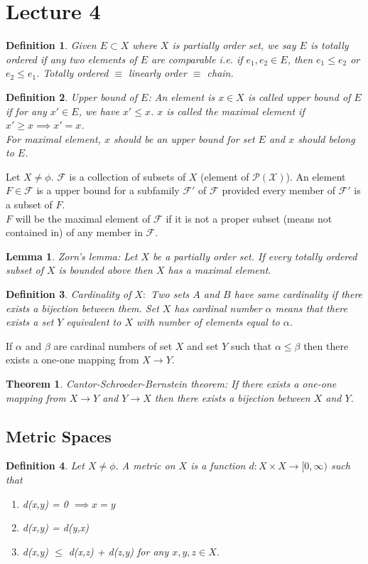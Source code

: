 \documentclass[12pt]{report}
\newtheorem{thm}{Theorem}
\newtheorem{lem}{Lemma}
\newtheorem{defn}{Definition}
\begin{document}
\section*{Lecture 4}
\begin{defn}
    Given $E \subset X$ where $X$ is partially order set, we say $E$ is totally ordered if any two elements of $E$ are comparable i.e. if $e_1,e_2 \in E$, then $e_1 \leq e_2$ or $e_2 \leq e_1$. Totally ordered $\equiv$ linearly order $\equiv$ chain.
\end{defn}
\begin{defn}
    Upper bound of $E$: An element is $x \in X$ is called upper bound of $E$ if for any $x' \in E$, we have $x' \leq x$. $x$ is called the maximal element if $x' \geq x \implies x' = x$.\\
    For maximal element, $x$ should be an upper bound for set $E$ and $x$ should belong to $E$.
\end{defn}
Let $X \neq \phi$. $\mathcal{F}$ is a collection of subsets of $X$ (element of $\mathcal{P(\text{X})}$). An element $F \in \mathcal{F}$ is a upper bound for a subfamily $\mathcal{F'}$ of $\mathcal{F}$ provided every member of $\mathcal{F'}$ is a subset of $F$.\\
$F$ will be the maximal element of $\mathcal{F}$ if it is not a proper subset (means not contained in) of any member in $\mathcal{F}$. 
\begin{lem}
    Zorn's lemma: Let $X$ be a partially order set. If every totally ordered subset of $X$ is bounded above then $X$ has a maximal element.
\end{lem}
\begin{defn}
    Cardinality of $X:$ Two sets $A$ and $B$ have same cardinality if there exists a bijection between them. Set $X$ has cardinal number $\alpha$ means that there exists a set $Y$ equivalent to $X$ with number of elements equal to $\alpha$.   
\end{defn}
If $\alpha$ and $\beta$ are cardinal numbers of set $X$ and set $Y$ such that $\alpha \leq \beta$ then there exists a one-one mapping from $X \to Y$.
\begin{thm}
    Cantor-Schroeder-Bernstein theorem: If there exists a one-one mapping from $X \to Y$ and $Y \to X$ then there exists a bijection between $X$ and $Y$.
\end{thm} 
\subsection*{Metric Spaces}
\begin{defn}
    Let $X \neq \phi$. A metric on $X$ is a function $d:X \times X \to [0, \infty)$ such that 
    \begin{enumerate}
        \item d(x,y) = 0 $\implies x = y$
        \item d(x,y) = d(y,x)
        \item d(x,y) $\leq$ d(x,z) + d(z,y) for any $x,y,z \in X$.
    \end{enumerate}
\end{defn}
\end{document}
